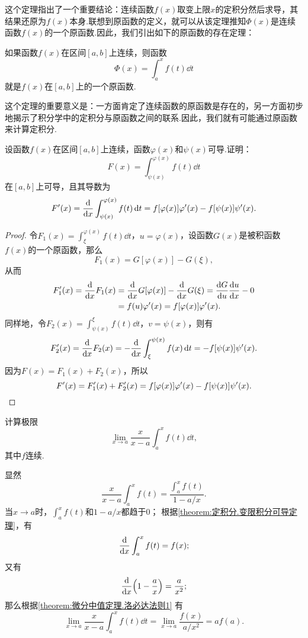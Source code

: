 这个定理指出了一个重要结论：连续函数\(f(x)\)取变上限\(x\)的定积分然后求导，其结果还原为\(f(x)\)本身.联想到原函数的定义，就可以从该定理推知\(\Phi(x)\)是连续函数\(f(x)\)的一个原函数.因此，我们引出如下的原函数的存在定理：

\begin{theorem}[原函数存在定理]\label{theorem:定积分.原函数存在定理}
如果函数\(f(x)\)在区间\([a,b]\)上连续，则函数\[
\Phi(x) = \int_a^x f(t) \dd{t}
\]就是\(f(x)\)在\([a,b]\)上的一个原函数.
\end{theorem}
这个定理的重要意义是：一方面肯定了连续函数的原函数是存在的，另一方面初步地揭示了积分学中的定积分与原函数之间的联系.因此，我们就有可能通过原函数来计算定积分.

\begin{example}
设函数\(f(x)\)在区间\([a,b]\)上连续，函数\(\varphi(x)\)和\(\psi(x)\)可导.证明：\[
F(x) = \int_{\psi(x)}^{\varphi(x)} f(t) \dd{t}
\]在\([a,b]\)上可导，且其导数为\begin{equation}\label{equation:定积分.含参变量积分的导数1}
F'(x) = \dv{x} \int_{\psi(x)}^{\varphi(x)} f(t) \dd{t}
= f[\varphi(x)] \varphi'(x) - f[\psi(x)] \psi'(x).
\end{equation}
\begin{proof}
令\(F_1(x) = \int_{\xi}^{\varphi(x)} f(t) \dd{t}\)，\(u = \varphi(x)\)，设函数\(G(x)\)是被积函数\(f(x)\)的一个原函数，那么\[
F_1(x) = G[\varphi(x)] - G(\xi),
\]从而\begin{align*}
F'_1(x) = \dv{x} F_1(x)
&= \dv{x} G[\varphi(x)] - \dv{x} G(\xi) = \dv{G}{u} \dv{u}{x} - 0 \\
&= f(u) \varphi'(x) = f[\varphi(x)] \varphi'(x).
\end{align*}
同样地，令\(F_2(x) = \int_{\psi(x)}^{\xi} f(t) \dd{t}\)，\(v = \psi(x)\)，则有\[
F'_2(x) = \dv{x} F_2(x) = -\dv{x} \int_{\xi}^{\psi(x)} f(x) \dd{t}
= -f[\psi(x)] \psi'(x).
\]
因为\(F(x) = F_1(x) + F_2(x)\)，所以\[
F'(x) = F'_1(x) + F'_2(x)
= f[\varphi(x)] \varphi'(x) - f[\psi(x)] \psi'(x).
\qedhere
\]
\end{proof}
\end{example}

\begin{example}
计算极限\[
\lim\limits_{x \to a} \frac{x}{x-a} \int_a^x f(t) \dd{t},
\]其中\(f\)连续.
\begin{solution}
显然\[
\frac{x}{x-a} \int_a^x f(t)
= \frac{\int_a^x f(t)}{1 - a/x}.
\]
当\(x \to a\)时，\(\int_a^x f(t)\)和\(1 - a/x\)都趋于0；
根据\cref{theorem:定积分.变限积分可导定理}，有\[
\dv{x} \int_a^x f(t) = f(x);
\]又有\[
\dv{x}(1 - \frac{a}{x}) = \frac{a}{x^2};
\]那么根据\cref{theorem:微分中值定理.洛必达法则1} 有\[
\lim\limits_{x \to a} \frac{x}{x-a} \int_a^x f(t) \dd{t}
= \lim\limits_{x \to a} \frac{f(x)}{a/x^2}
= a f(a).
\]
\end{solution}
\end{example}

